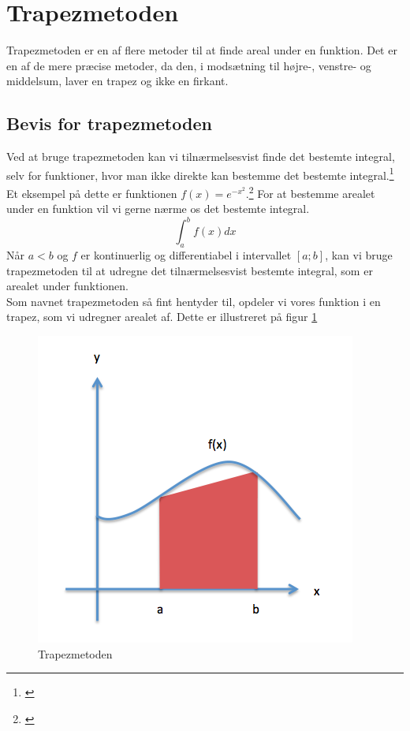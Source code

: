 \documentclass[12pt]{article}
\numberwithin{equation}{section}
\begin{document}
\section{Trapezmetoden}
\label{sec:trapezmetoden}
Trapezmetoden er en af flere metoder til at finde areal under en funktion. Det er en af de mere præcise metoder, da den, i modsætning til højre-, venstre- og middelsum, laver en trapez og ikke en firkant.
\subsection{Bevis for trapezmetoden}
Ved at bruge trapezmetoden kan vi tilnærmelsesvist finde det bestemte integral, selv for funktioner, hvor man ikke direkte kan bestemme det bestemte integral.\footnote{\cite[s. 13]{2012matA}} Et eksempel på dette er funktionen $f(x)=e^{-x^{2}}$.\footnote{\cite[s. 12]{2012matA}}
For at bestemme arealet under en funktion vil vi gerne nærme os det bestemte integral.
\begin{equation}
\int_{a}^{b}f(x)dx \nonumber
\end{equation}
Når $a<b$ og $f$ er kontinuerlig og differentiabel i intervallet $[a;b]$, kan vi bruge trapezmetoden til at udregne det tilnærmelsesvist bestemte integral, som er arealet under funktionen.\\
Som navnet trapezmetoden så fint hentyder til, opdeler vi vores funktion i en trapez, som vi udregner arealet af. Dette er illustreret på figur \ref{fig:trapezmetoden}
\begin{figure}[H]
\centering
\includegraphics[scale=0.5]{Billeder/trapezmetoden.png}
\caption{Trapezmetoden}
\label{fig:trapezmetoden}
\end{figure}
\end{document}
